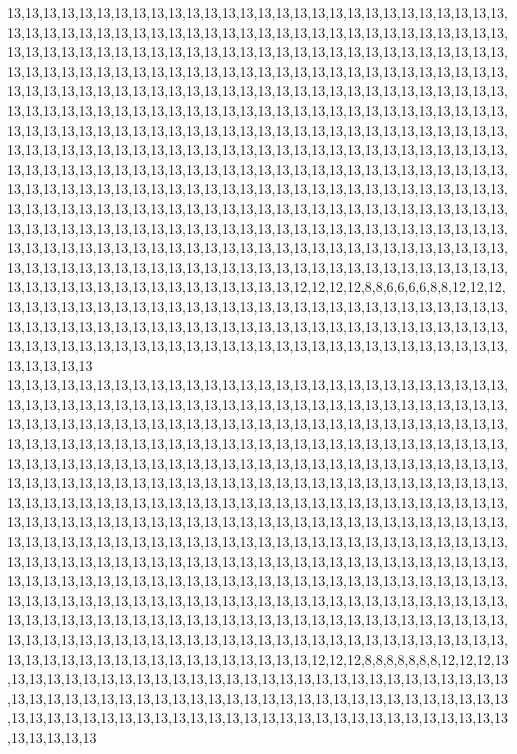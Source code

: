 13,13,13,13,13,13,13,13,13,13,13,13,13,13,13,13,13,13,13,13,13,13,13,13,13,13,13,13,13,13,13,13,13,13,13,13,13,13,13,13,13,13,13,13,13,13,13,13,13,13,13,13,13,13,13,13,13,13,13,13,13,13,13,13,13,13,13,13,13,13,13,13,13,13,13,13,13,13,13,13,13,13,13,13,13,13,13,13,13,13,13,13,13,13,13,13,13,13,13,13,13,13,13,13,13,13,13,13,13,13,13,13,13,13,13,13,13,13,13,13,13,13,13,13,13,13,13,13,13,13,13,13,13,13,13,13,13,13,13,13,13,13,13,13,13,13,13,13,13,13,13,13,13,13,13,13,13,13,13,13,13,13,13,13,13,13,13,13,13,13,13,13,13,13,13,13,13,13,13,13,13,13,13,13,13,13,13,13,13,13,13,13,13,13,13,13,13,13,13,13,13,13,13,13,13,13,13,13,13,13,13,13,13,13,13,13,13,13,13,13,13,13,13,13,13,13,13,13,13,13,13,13,13,13,13,13,13,13,13,13,13,13,13,13,13,13,13,13,13,13,13,13,13,13,13,13,13,13,13,13,13,13,13,13,13,13,13,13,13,13,13,13,13,13,13,13,13,13,13,13,13,13,13,13,13,13,13,13,13,13,13,13,13,13,13,13,13,13,13,13,13,13,13,13,13,13,13,13,13,13,13,13,13,13,13,13,13,13,13,13,13,13,13,13,13,13,13,13,13,13,13,13,13,13,13,13,13,13,13,13,13,13,13,13,13,13,13,13,13,13,13,13,13,13,13,13,13,13,13,13,13,13,13,13,13,13,13,13,13,13,13,13,13,13,13,13,13,13,13,13,13,13,13,13,13,13,13,13,13,13,13,13,13,13,13,13,13,13,13,13,13,13,13,13,13,13,13,13,12,12,12,12,8,8,6,6,6,6,8,8,12,12,12,13,13,13,13,13,13,13,13,13,13,13,13,13,13,13,13,13,13,13,13,13,13,13,13,13,13,13,13,13,13,13,13,13,13,13,13,13,13,13,13,13,13,13,13,13,13,13,13,13,13,13,13,13,13,13,13,13,13,13,13,13,13,13,13,13,13,13,13,13,13,13,13,13,13,13,13,13,13,13,13,13,13,13,13,13,13,13,13,13
13,13,13,13,13,13,13,13,13,13,13,13,13,13,13,13,13,13,13,13,13,13,13,13,13,13,13,13,13,13,13,13,13,13,13,13,13,13,13,13,13,13,13,13,13,13,13,13,13,13,13,13,13,13,13,13,13,13,13,13,13,13,13,13,13,13,13,13,13,13,13,13,13,13,13,13,13,13,13,13,13,13,13,13,13,13,13,13,13,13,13,13,13,13,13,13,13,13,13,13,13,13,13,13,13,13,13,13,13,13,13,13,13,13,13,13,13,13,13,13,13,13,13,13,13,13,13,13,13,13,13,13,13,13,13,13,13,13,13,13,13,13,13,13,13,13,13,13,13,13,13,13,13,13,13,13,13,13,13,13,13,13,13,13,13,13,13,13,13,13,13,13,13,13,13,13,13,13,13,13,13,13,13,13,13,13,13,13,13,13,13,13,13,13,13,13,13,13,13,13,13,13,13,13,13,13,13,13,13,13,13,13,13,13,13,13,13,13,13,13,13,13,13,13,13,13,13,13,13,13,13,13,13,13,13,13,13,13,13,13,13,13,13,13,13,13,13,13,13,13,13,13,13,13,13,13,13,13,13,13,13,13,13,13,13,13,13,13,13,13,13,13,13,13,13,13,13,13,13,13,13,13,13,13,13,13,13,13,13,13,13,13,13,13,13,13,13,13,13,13,13,13,13,13,13,13,13,13,13,13,13,13,13,13,13,13,13,13,13,13,13,13,13,13,13,13,13,13,13,13,13,13,13,13,13,13,13,13,13,13,13,13,13,13,13,13,13,13,13,13,13,13,13,13,13,13,13,13,13,13,13,13,13,13,13,13,13,13,13,13,13,13,13,13,13,13,13,13,13,13,13,13,13,13,13,13,13,13,13,13,13,13,13,13,13,13,13,13,13,13,13,13,13,13,13,13,13,13,13,12,12,12,8,8,8,8,8,8,8,12,12,12,13,13,13,13,13,13,13,13,13,13,13,13,13,13,13,13,13,13,13,13,13,13,13,13,13,13,13,13,13,13,13,13,13,13,13,13,13,13,13,13,13,13,13,13,13,13,13,13,13,13,13,13,13,13,13,13,13,13,13,13,13,13,13,13,13,13,13,13,13,13,13,13,13,13,13,13,13,13,13,13,13,13,13,13,13,13,13,13,13,13
